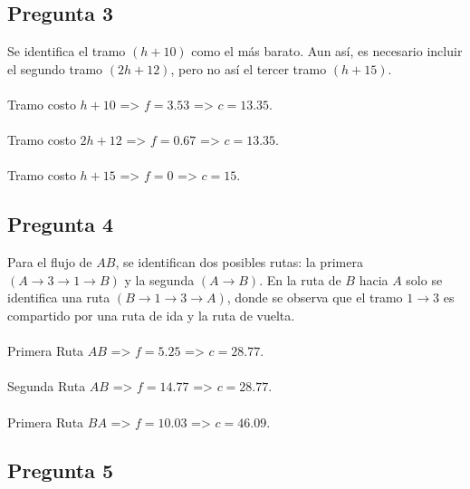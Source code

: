 \documentclass{article}  %
\begin{document}
\subsection{Pregunta 3}

Se identifica el tramo \( (h+10) \) como el más barato. Aun así, es necesario incluir el segundo tramo \( (2h+12) \), pero no así el tercer tramo \( (h+15) \).
\\ \\
Tramo costo \( h + 10 \) => \( f = 3.53 \) => \( c = 13.35 \).
\\ \\
Tramo costo \( 2h + 12 \) => \( f = 0.67 \) => \( c = 13.35 \).
\\ \\
Tramo costo \( h + 15 \) => \( f = 0 \) => \( c = 15 \).

\subsection{Pregunta 4}

Para el flujo de \( AB \), se identifican dos posibles rutas: la primera \( (A \rightarrow 3 \rightarrow 1 \rightarrow B) \) y la segunda \( (A \rightarrow B) \). En la ruta de \( B \) hacia \( A \) solo se identifica una ruta \( (B \rightarrow 1 \rightarrow 3 \rightarrow A) \), donde se observa que el tramo \( 1 \rightarrow 3 \) es compartido por una ruta de ida y la ruta de vuelta.
\\ \\
Primera Ruta \( AB \) => \( f = 5.25 \) => \( c = 28.77 \).
\\ \\
Segunda Ruta \( AB \) => \( f = 14.77 \) => \( c = 28.77 \).
\\ \\
Primera Ruta \( BA \) => \( f = 10.03 \) => \( c = 46.09 \).

\subsection{Pregunta 5}
\end{document}
